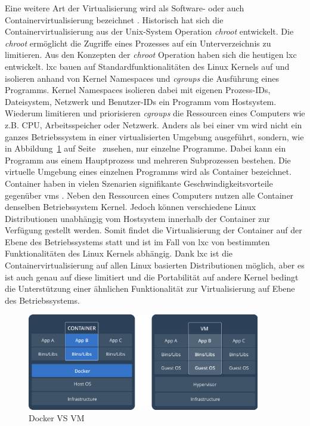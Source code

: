 Eine weitere Art der Virtualisierung wird als Software- oder auch Containervirtualisierung bezeichnet \cite{software_container}. Historisch hat sich die Containervirtualisierung aus der Unix-System Operation \textit{chroot} entwickelt. Die \textit{chroot} ermöglicht die Zugriffe eines Prozesses auf ein Unterverzeichnis zu limitieren. Aus den Konzepten der \textit{chroot} Operation haben sich die heutigen \ac{lxc} entwickelt. \ac{lxc} bauen auf Standardfunktionalitäten des Linux Kernels auf und isolieren anhand von Kernel Namespaces und \textit{cgroups} die Ausführung eines Programms. Kernel Namespaces isolieren dabei mit eigenen Prozess-IDs, Dateisystem, Netzwerk und Benutzer-IDs ein Programm vom Hostsystem. Wiederum limitieren und priorisieren \textit{cgroups} die Ressourcen eines Computers wie z.B. CPU, Arbeitsspeicher oder Netzwerk. Anders als bei einer \ac{vm} wird nicht ein ganzes Betriebssystem in einer virtualisierten Umgebung ausgeführt, sondern, wie in Abbildung~\ref{fig:DOCKER_VS_VM} auf Seite~\pageref{fig:DOCKER_VS_VM} zusehen, nur einzelne Programme. Dabei kann ein Programm aus einem Hauptprozess und mehreren Subprozessen bestehen. Die virtuelle Umgebung eines einzelnen Programms wird als Container bezeichnet. Container haben in vielen Szenarien signifikante Geschwindigkeitsvorteile gegenüber \acp{vm} \cite{performance_container}. Neben den Ressourcen eines Computers nutzen alle Container denselben Betriebssystem Kernel. Jedoch können verschiedene Linux Distributionen unabhängig vom Hostsystem innerhalb der Container zur Verfügung gestellt werden. Somit findet die Virtualisierung der Container auf der Ebene des Betriebssystems statt und ist im Fall von \ac{lxc} von bestimmten Funktionalitäten des Linux Kernels abhängig. Dank \ac{lxc} ist die Containervirtualisierung auf allen Linux basierten Distributionen möglich, aber es ist auch genau auf diese limitiert und die Portabilität auf andere Kernel bedingt die Unterstützung einer ähnlichen Funktionalität zur Virtualisierung auf Ebene des Betriebssystems.

\begin{figure}
    \centering
    \includegraphics[width=4in]{figures/docker-vs-vm.png}
    \caption[Docker VS VM]
    {Docker VS VM \cite{what_container}}
    \label{fig:DOCKER_VS_VM}
\end{figure}

